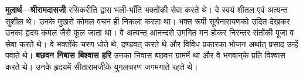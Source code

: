 \begin{sloppypar}\justifying{}
\textbf{मूलार्थ}—\textbf{श्रीरामदासजी} रसिक\-रीति द्वारा भली-भाँति भक्तोंकी सेवा करते थे। वे स्वयं शीतल एवं अत्यन्त सुशील थे। उनके मुखसे कोमल वचन ही निकला करता था। भक्त रूपी सूर्यनारायणको उदित देखकर उनका हृदय कमल जैसे फूल जाता था। वे अत्यन्त आनन्दसे उमगित मन होकर निरन्तर संतोंकी पूजा व सेवा करते थे। वे भक्तोंके चरण धोते थे, दण्डवत् करते थे और विविध प्रकारका भोजन अर्थात् प्रसाद उन्हें पवाते थे। \textbf{बछवन निबास बिश्वास हरि} उनका निवास बछवन ग्राममें था और वे भगवान्‌के प्रति विश्वास करते थे। उनके हृदयमें सीता\-रामजीके युगलचरण जगमगाते रहते थे।
\end{sloppypar}


